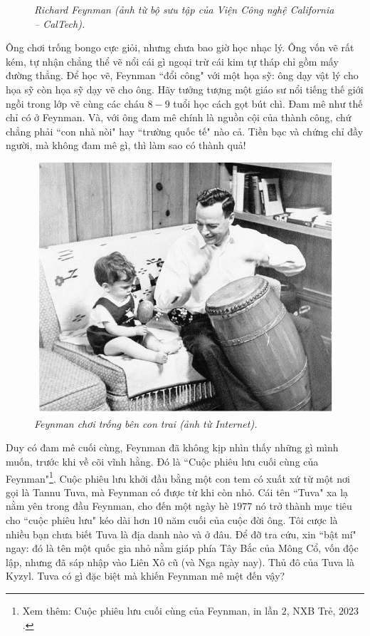 \begin{multicols}{2}
\begin{figure}[H]
		\caption{\small\textit{\color{quantoan}Richard Feynman (ảnh từ bộ sưu tập của Viện Công nghệ California -- CalTech).}}
		\vspace*{-10pt}
	\end{figure}
	Ông chơi trống bongo cực giỏi, nhưng chưa bao giờ học nhạc lý. Ông vốn vẽ rất kém, tự nhận chẳng thể vẽ nổi cái gì ngoại trừ cái kim tự tháp chỉ gồm mấy đường thẳng. Để học vẽ, Feynman ``đổi công" với một họa sỹ: ông dạy vật lý cho họa sỹ còn họa sỹ dạy vẽ cho ông. Hãy tưởng tượng một giáo sư nổi tiếng thế giới ngồi trong lớp vẽ cùng các cháu $8-9$ tuổi học cách gọt bút chì. Đam mê như thế chỉ có ở Feynman. Và, với ông đam mê chính là nguồn cội của thành công, chứ chẳng phải ``con nhà nòi" hay ``trường quốc tế" nào cả. Tiền bạc và chứng chỉ đầy người, mà không đam mê gì, thì làm sao có thành quả! 
	\begin{figure}[H]
		\vspace*{-5pt}
		\centering
		\captionsetup{labelformat= empty, justification=centering}
		\includegraphics[width= 1\linewidth]{2a}
		\caption{\small\textit{\color{quantoan}Feynman chơi trống bên con trai (ảnh từ Internet).}}
		\vspace*{-10pt}
	\end{figure}
	Duy có đam mê cuối cùng, Feynman đã không kịp nhìn thấy những gì mình muốn, trước khi về cõi vĩnh hằng. Đó là ``Cuộc phiêu lưu cuối cùng của Feynman"\footnote[2]{\color{quantoan}Xem thêm: Cuộc phiêu lưu cuối cùng của Feynman, in lần $2$, NXB Trẻ, $2023$.}. Cuộc phiêu lưu khởi đầu bằng một con tem có xuất xứ từ một nơi gọi là Tannu Tuva, mà Feynman có được từ khi còn nhỏ. Cái tên ``Tuva" xa lạ nằm yên trong đầu Feynman, cho đến một ngày hè $1977$ nó trở thành mục tiêu cho ``cuộc phiêu lưu" kéo dài hơn $10$ năm cuối của cuộc đời ông. Tôi cược là nhiều bạn chưa biết Tuva là địa danh nào và ở đâu. Để đỡ tra cứu, xin ``bật mí" ngay: đó là tên một quốc gia nhỏ nằm giáp phía Tây Bắc của Mông Cổ, vốn độc lập, nhưng đã sáp nhập vào Liên Xô cũ (và Nga ngày nay). Thủ đô của Tuva là Kyzyl. Tuva có gì đặc biệt mà khiến Feynman mê mệt đến vậy?

\end{multicols}
